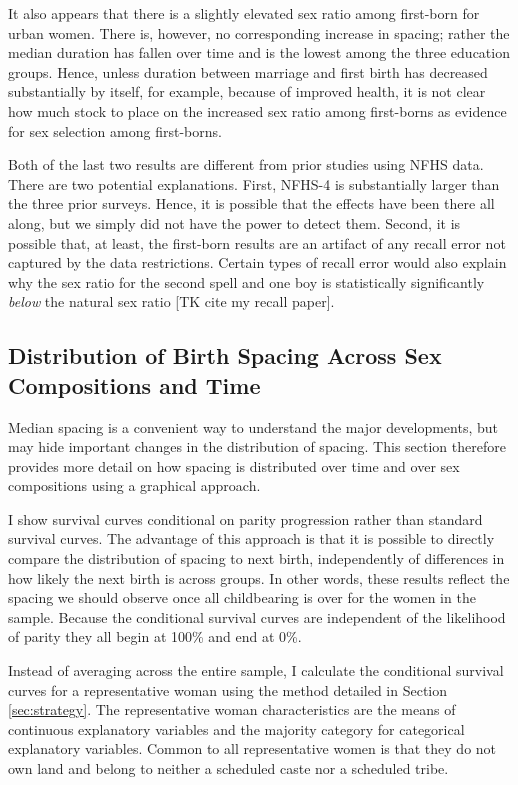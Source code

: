 \documentclass[12pt,letterpaper]{article}
\begin{document}
It also appears that there is a slightly elevated sex ratio among 
first-born for urban women. 
There is, however, no corresponding increase in spacing; rather
the median duration has fallen over time and is the lowest among
the three education groups.
Hence, unless duration between marriage and first birth has decreased 
substantially by itself, for example, because of improved health, it
is not clear how much stock to place on the increased sex ratio
among first-borns as evidence for sex selection among first-borns.

Both of the last two results are different from prior studies using NFHS data.
There are two potential explanations.
First, NFHS-4 is substantially larger than the three prior surveys.
Hence, it is possible that the effects have been there all along, but 
we simply did not have the power to detect them.
Second, it is possible that, at least, the first-born results are an
artifact of any recall error not captured by the data restrictions.
Certain types of recall error would also explain why the sex ratio for
the second spell and one boy is statistically significantly \emph{below} 
the natural sex ratio [TK cite my recall paper].


\subsection{Distribution of Birth Spacing Across Sex Compositions and Time}

Median spacing is a convenient way to understand the major developments,
but may hide important changes in the distribution of spacing.
This section therefore provides more detail on how spacing is distributed
over time and over sex compositions using a graphical approach.

I show survival curves conditional on parity progression rather than
standard survival curves. 
The advantage of this approach is that it is possible to directly compare 
the distribution of spacing to next birth, independently of differences in
how likely the next birth is across groups.
In other words, these results reflect the spacing we should observe once
all childbearing is over for the women in the sample.
Because the conditional survival curves are independent of the likelihood
of parity they all begin at 100\% and end at 0\%.

Instead of averaging across the entire sample, I calculate the conditional
survival curves for a representative woman using the method detailed in 
Section \ref{sec:strategy}.
The representative woman characteristics are the means of continuous explanatory 
variables and the majority category for categorical explanatory variables.
Common to all representative women is that they do not own land and belong to neither 
a scheduled caste nor a scheduled tribe.
\end{document}
